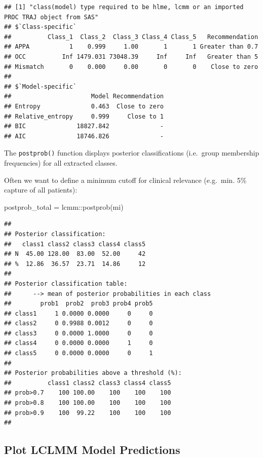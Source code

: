 \documentclass[
]{book}
\newenvironment{Shaded}{\begin{snugshade}}{\end{snugshade}}
\newcommand{\FunctionTok}[1]{\textcolor[rgb]{0.00,0.00,0.00}{#1}}
\newcommand{\NormalTok}[1]{#1}
\newcommand{\OtherTok}[1]{\textcolor[rgb]{0.56,0.35,0.01}{#1}}
\newcommand{\SpecialCharTok}[1]{\textcolor[rgb]{0.00,0.00,0.00}{#1}}
\begin{document}
\begin{verbatim}
## [1] "class(model) type required to be hlme, lcmm or an imported PROC TRAJ object from SAS"
## $`Class-specific`
##          Class_1  Class_2  Class_3 Class_4 Class_5   Recommendation
## APPA           1    0.999     1.00       1       1 Greater than 0.7
## OCC          Inf 1479.031 73048.39     Inf     Inf   Greater than 5
## Mismatch       0    0.000     0.00       0       0    Close to zero
## 
## $`Model-specific`
##                      Model Recommendation
## Entropy              0.463  Close to zero
## Relative_entropy     0.999     Close to 1
## BIC              18827.842              -
## AIC              18746.826              -
\end{verbatim}

The \texttt{postprob()} function displays posterior classifications (i.e.~group membership frequencies) for all extracted classes.

Often we want to define a minimum cutoff for clinical relevance (e.g.~min. 5\% capture of all patients):

\begin{Shaded}
\begin{Highlighting}[]
\NormalTok{postprob\_total }\OtherTok{=}\NormalTok{ lcmm}\SpecialCharTok{::}\FunctionTok{postprob}\NormalTok{(mi)}
\end{Highlighting}
\end{Shaded}

\begin{verbatim}
##  
## Posterior classification: 
##   class1 class2 class3 class4 class5
## N  45.00 128.00  83.00  52.00     42
## %  12.86  36.57  23.71  14.86     12
##  
## Posterior classification table: 
##      --> mean of posterior probabilities in each class 
##        prob1  prob2  prob3 prob4 prob5
## class1     1 0.0000 0.0000     0     0
## class2     0 0.9988 0.0012     0     0
## class3     0 0.0000 1.0000     0     0
## class4     0 0.0000 0.0000     1     0
## class5     0 0.0000 0.0000     0     1
##  
## Posterior probabilities above a threshold (%): 
##          class1 class2 class3 class4 class5
## prob>0.7    100 100.00    100    100    100
## prob>0.8    100 100.00    100    100    100
## prob>0.9    100  99.22    100    100    100
## 
\end{verbatim}

\hypertarget{plot-lclmm-model-predictions}{%
\subsection{Plot LCLMM Model Predictions}\label{plot-lclmm-model-predictions}}
\end{document}
